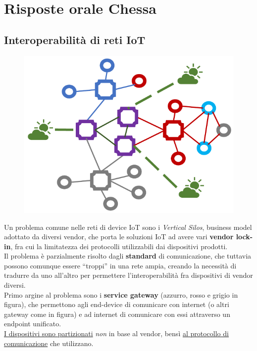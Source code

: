 \chapter{Risposte orale Chessa}

\section{Interoperabilità di reti IoT}

\begin{figure}[htbp]
   \centering
   \includegraphics{images/questions/Schermata del 2023-10-19 10-03-17.png}
   \label{fig:dom1}
\end{figure}
Un problema comune nelle reti di device IoT sono i \textit{Vertical Silos}, business model adottato da diversi vendor, che porta le soluzioni IoT ad avere vari \textbf{vendor lock-in}, fra cui la limitatezza dei protocolli utilizzabili dai dispositivi prodotti.\\
Il problema è parzialmente risolto dagli \textbf{standard} di comunicazione, che tuttavia possono comunque essere ``troppi'' in una rete ampia, creando la necessità di tradurre da uno all'altro per permettere l'interoperabilità fra dispositivi di vendor diversi.\\
Primo argine al problema sono i \textbf{service gateway} (azzurro, rosso e grigio in figura), che permettono agli end-device di comunicare con internet (o altri gateway come in figura) e ad internet di comunicare con essi attraverso un endpoint unificato.\\
\ul{I dispositivi sono partizionati} \textit{non} in base al vendor, bensì \ul{al protocollo di comunicazione} che utilizzano.


